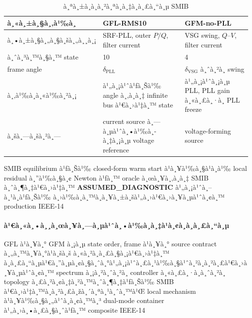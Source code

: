 ﻿\documentclass[12pt,a4paper]{article}
\newcommand{\source}[1]{\textbf{#1}}
\begin{document}
\begin{table}[H]
\centering
\caption{à¸ªà¸±à¸à¸à¸²à¸ªà¸­à¸‡à¸à¸£à¸“à¸µ SMIB}
\begin{tabularx}{\textwidth}{@{}l X X@{}}
\toprule
à¸«à¸±à¸§à¸‚à¹‰à¸­ & GFL-RMS10 & GFM-no-PLL \\
\midrule
à¸•à¸±à¸§à¸„à¸§à¸šà¸„à¸¸à¸¡ & SRF-PLL, outer $P/Q$, filter current & VSG swing, $Q$--$V$, filter current \\
à¸ˆà¸³à¸™à¸§à¸™ state & 10 & 4 \\
frame angle & $\delta_{\mathrm{PLL}}$ & $\delta_{\mathrm{VSG}}$ à¸ˆà¸²à¸ swing \\
à¸‚à¹‰à¸­à¸«à¹‰à¸²à¸¡ & à¹„à¸¡à¹ˆà¹ƒà¸Šà¹‰ angle à¸‚à¸­à¸‡ infinite bus à¹€à¸›à¹‡à¸™ state & à¹„à¸¡à¹ˆà¸¡à¸µ PLL, PLL gain à¸«à¸£à¸·à¸­ PLL freeze \\
à¸šà¸—à¸šà¸²à¸— & current source à¸—à¸µà¹ˆà¸•à¹‰à¸­à¸‡à¸¡à¸µ voltage reference & voltage-forming source \\
\bottomrule
\end{tabularx}
\end{table}

SMIB equilibrium à¹ƒà¸Šà¹‰ closed-form warm start à¹à¸¥à¹‰à¸§à¹à¸à¹‰ local residual à¸”à¹‰à¸§à¸¢
Newton à¹ƒà¸™ oracle à¸œà¸¥à¸‚à¸­à¸‡ SMIB à¸ˆà¸¶à¸‡à¹€à¸›à¹‡à¸™\linebreak
\source{ASSUMED\_DIAGNOSTIC} à¹„à¸¡à¹ˆà¸–à¸¹à¸à¹ƒà¸Šà¹‰
à¸›à¹‰à¸­à¸™à¸à¸¥à¸±à¸šà¹„à¸›à¹€à¸›à¸¥à¸µà¹ˆà¸¢à¸™ production IEEE-14

\paragraph{à¹€à¸«à¸•à¸¸à¸œà¸¥à¸—à¸µà¹ˆà¸•à¹‰à¸­à¸‡à¹à¸¢à¸à¸à¸£à¸“à¸µ}
GFL à¹à¸¥à¸° GFM à¸¡à¸µ state order, frame à¹à¸¥à¸° source contract à¸„à¸™à¸¥à¸°à¹à¸šà¸š à¸«à¸²à¸à¸£à¸§à¸¡à¹€à¸›à¹‡à¸™
à¸à¸£à¸“à¸µà¹€à¸”à¸µà¸¢à¸§à¸ˆà¸°à¹„à¸¡à¹ˆà¸£à¸¹à¹‰à¸§à¹ˆà¸²à¸à¸²à¸£à¹€à¸›à¸¥à¸µà¹ˆà¸¢à¸™ spectrum à¸¡à¸²à¸ˆà¸²à¸ controller à¸«à¸£à¸·à¸­à¸ˆà¸²à¸ topology
à¸£à¸²à¸¢à¸‡à¸²à¸™à¸ˆà¸¶à¸‡à¹ƒà¸Šà¹‰ SMIB à¹€à¸›à¹‡à¸™à¸à¸²à¸£à¸žà¸´à¸ªà¸¹à¸ˆà¸™à¹Œ local mechanism à¹à¸¥à¹‰à¸§à¸„à¹ˆà¸­à¸¢à¸™à¸³ dual-mode
container à¹„à¸›à¸•à¸£à¸§à¸ˆà¹ƒà¸™ composite IEEE-14

\par\vspace{5pt}
\end{document}
